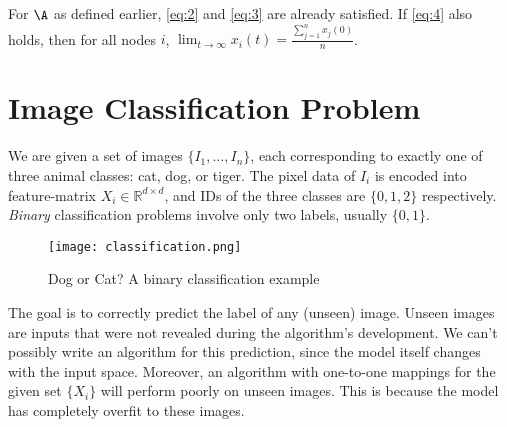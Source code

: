 \documentclass[12pt]{article}
\begin{document}
\noindent For $\A$ as defined earlier, \eqref{eq:2} and \eqref{eq:3} are already satisfied. If \eqref{eq:4} also holds, then for all nodes $i$, $\lim_{t\to \infty} x_i(t) = \frac{\sum_{j=1}^{n} x_j(0)}{n}$.


%
%
%


\section{Image Classification Problem}


We are given a set of images $\{I_1, \dots, I_n\}$, each corresponding to exactly one of three animal classes: cat, dog, or tiger. The pixel data of $I_i$ is encoded into feature-matrix $X_i \in \mathbb{R}^{d\times d}$, and IDs of the three classes are $\{0,1,2\}$ respectively. \textit{Binary} classification problems involve only two labels, usually $\{0,1\}$.
\\
\begin{figure}[h]

\centering
\texttt{[image: classification.png]}
\caption{Dog or Cat? A binary classification example \cite{binaryclassification}}
\end{figure}


\noindent The goal is to correctly predict the label of any (unseen) image. Unseen images are inputs that were not revealed during the algorithm's development. We can't possibly write an algorithm for this prediction, since the model itself changes with the input space. Moreover, an algorithm with one-to-one mappings for the given set $\{X_i\}$ will perform poorly on unseen images. This is because the model has completely overfit to these images.
\\
\end{document}

